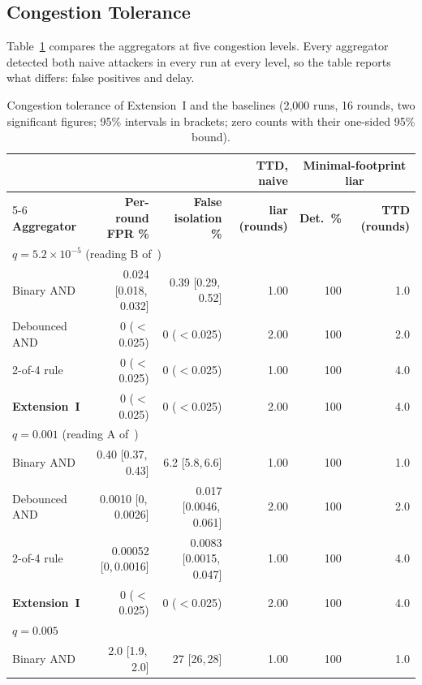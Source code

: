 \documentclass{ieeeaccess}
\begin{document}
\subsection{Congestion Tolerance}
\label{sec:res-ext1}
Table~\ref{tab:headline} compares the aggregators at five congestion
levels.  Every aggregator detected both naive attackers in every run at
every level, so the table reports what differs: false positives and
delay.

\begin{table}[!t]
\caption{Congestion tolerance of Extension~I and the baselines (2{,}000 runs, 16 rounds, two significant figures; 95\% intervals in brackets; zero counts with their one-sided 95\% bound).}
\label{tab:headline}
\centering
\renewcommand{\arraystretch}{1.05}
\setlength{\tabcolsep}{5pt}
\footnotesize
\begin{tabular}{lrrrrr}
\toprule
 & & & \textbf{TTD, naive} & \multicolumn{2}{c}{\textbf{Minimal-footprint liar}} \\
\cmidrule(lr){5-6}
\textbf{Aggregator} & \textbf{Per-round FPR \%} & \textbf{False isolation \%} &
\textbf{liar (rounds)} & \textbf{Det.\ \%} & \textbf{TTD (rounds)} \\
\midrule
\multicolumn{6}{l}{$q=5.2\times10^{-5}$ (reading B of~\cite{soula2024iodt})} \\
Binary AND~\cite{soula2024iodt} & 0.024 [0.018,\,0.032] & 0.39 [0.29,\,0.52] & 1.00 & 100 & 1.0 \\
Debounced AND & 0 ($<$0.025) & 0 ($<$0.025) & 2.00 & 100 & 2.0 \\
2-of-4 rule & 0 ($<$0.025) & 0 ($<$0.025) & 1.00 & 100 & 4.0 \\
\textbf{Extension~I} & 0 ($<$0.025) & 0 ($<$0.025) & 2.00 & 100 & 4.0 \\
\midrule
\multicolumn{6}{l}{$q=0.001$ (reading A of~\cite{soula2024iodt})} \\
Binary AND~\cite{soula2024iodt} & 0.40 [0.37,\,0.43] & 6.2 [5.8,\,6.6] & 1.00 & 100 & 1.0 \\
Debounced AND & 0.0010 [0,\,0.0026] & 0.017 [0.0046,\,0.061] & 2.00 & 100 & 2.0 \\
2-of-4 rule & 0.00052 [0,\,0.0016] & 0.0083 [0.0015,\,0.047] & 1.00 & 100 & 4.0 \\
\textbf{Extension~I} & 0 ($<$0.025) & 0 ($<$0.025) & 2.00 & 100 & 4.0 \\
\midrule
\multicolumn{6}{l}{$q=0.005$} \\
Binary AND~\cite{soula2024iodt} & 2.0 [1.9,\,2.0] & 27 [26,\,28] & 1.00 & 100 & 1.0 \\

\end{tabular}
\end{table}
\end{document}
